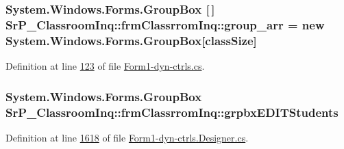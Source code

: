 \hypertarget{class_sr_p___classroom_inq_1_1frm_classrrom_inq_a68d2b307c87e71592f6e170c9ce2aad2}{
\subsubsection[{group\-\_\-arr}]{\setlength{\rightskip}{0pt plus 5cm}\-System.\-Windows.\-Forms.\-Group\-Box \mbox{[}$\,$\mbox{]} {\bf \-Sr\-P\-\_\-\-Classroom\-Inq\-::frm\-Classrrom\-Inq\-::group\-\_\-arr} = new \-System.\-Windows.\-Forms.\-Group\-Box\mbox{[}{\bf class\-Size}\mbox{]}}}
\label{class_sr_p___classroom_inq_1_1frm_classrrom_inq_a68d2b307c87e71592f6e170c9ce2aad2}


\-Definition at line \hyperlink{_form1-dyn-ctrls_8cs_source_l00123}{123} of file \hyperlink{_form1-dyn-ctrls_8cs_source}{\-Form1-\/dyn-\/ctrls.\-cs}.

\hypertarget{class_sr_p___classroom_inq_1_1frm_classrrom_inq_a934cec75a0d91eca5ca9786b078462a3}{
\subsubsection[{grpbx\-E\-D\-I\-T\-Students}]{\setlength{\rightskip}{0pt plus 5cm}\-System.\-Windows.\-Forms.\-Group\-Box {\bf \-Sr\-P\-\_\-\-Classroom\-Inq\-::frm\-Classrrom\-Inq\-::grpbx\-E\-D\-I\-T\-Students}}}
\label{class_sr_p___classroom_inq_1_1frm_classrrom_inq_a934cec75a0d91eca5ca9786b078462a3}


\-Definition at line \hyperlink{_form1-dyn-ctrls_8_designer_8cs_source_l01618}{1618} of file \hyperlink{_form1-dyn-ctrls_8_designer_8cs_source}{\-Form1-\/dyn-\/ctrls.\-Designer.\-cs}.

